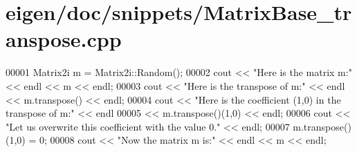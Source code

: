 \hypertarget{eigen_2doc_2snippets_2_matrix_base__transpose_8cpp_source}{}\section{eigen/doc/snippets/\+Matrix\+Base\+\_\+transpose.cpp}
\label{eigen_2doc_2snippets_2_matrix_base__transpose_8cpp_source}

\begin{DoxyCode}
00001 Matrix2i m = Matrix2i::Random();
00002 cout << \textcolor{stringliteral}{"Here is the matrix m:"} << endl << m << endl;
00003 cout << \textcolor{stringliteral}{"Here is the transpose of m:"} << endl << m.transpose() << endl;
00004 cout << \textcolor{stringliteral}{"Here is the coefficient (1,0) in the transpose of m:"} << endl
00005      << m.transpose()(1,0) << endl;
00006 cout << \textcolor{stringliteral}{"Let us overwrite this coefficient with the value 0."} << endl;
00007 m.transpose()(1,0) = 0;
00008 cout << \textcolor{stringliteral}{"Now the matrix m is:"} << endl << m << endl;
\end{DoxyCode}
